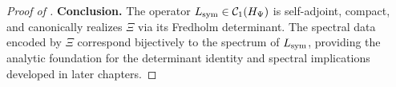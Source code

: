 \begin{proof}[Proof of ]
\medskip
\noindent\textbf{Conclusion.}
The operator \( L_{\mathrm{sym}} \in \mathcal{C}_1(H_{\Psi}) \) is self-adjoint, compact, and canonically realizes \( \Xi \) via its Fredholm determinant. The spectral data encoded by \( \Xi \) correspond bijectively to the spectrum of \( L_{\mathrm{sym}} \), providing the analytic foundation for the determinant identity and spectral implications developed in later chapters.
\end{proof}
